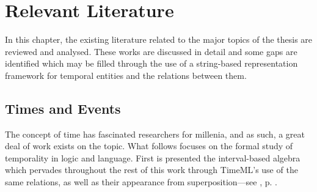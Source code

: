 \documentclass[a4paper,12pt,leqno,twoside]{article}
\begin{document}
\section{Relevant Literature}\label{sec:litreview}
In this chapter, the existing literature related to the major topics of the thesis are reviewed and analysed. These works are discussed in detail and some gaps are identified which may be filled through the use of a string-based representation framework for temporal entities and the relations between them.
\subsection{Times and Events}\label{sub:timesevents}
The concept of time has fascinated researchers for millenia, and as such, a great deal of work exists on the topic. What follows focuses on the formal study of temporality in logic and language. First is presented the interval-based algebra which pervades throughout the rest of this work through TimeML's use of the same relations, as well as their appearance from superposition---see , p. \pageref{tab:allen-rels-strings}.
\end{document}
